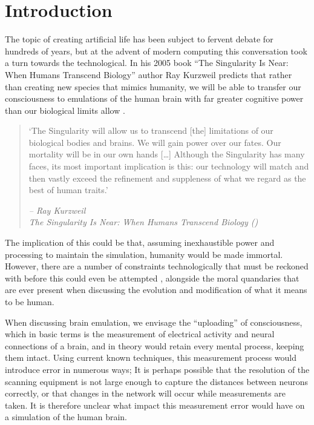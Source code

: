 \chapter{Introduction}


The topic of creating artificial life has been subject to fervent debate for
hundreds of years, but at the advent of modern computing this conversation took
a turn towards the technological. In his 2005 book “The Singularity Is Near:
When Humans Transcend Biology” author Ray Kurzweil predicts that rather than
creating new species that mimics humanity, we will be able to transfer our
consciousness to emulations of the human brain with far greater cognitive power
than our biological limits allow \autocite{kurzweil_singularity_2006}.

\begin{quote}
      `The Singularity will allow us to transcend [the] limitations of our
      biological bodies and brains. We will gain power over our fates. Our
      mortality will be in our own hands [\ldots] Although the Singularity has
      many faces, its most important implication is this: our technology will
      match and then vastly exceed the refinement and suppleness of what we
      regard as the best of human traits.'
\begin{flushright}
      \textit{-- Ray Kurzweil \\ The Singularity Is Near: When Humans Transcend
      Biology (\citeyear{kurzweil_singularity_2006})}
  \end{flushright}
\end{quote}  

The implication of this could be that, assuming inexhaustible power and
processing to maintain the simulation, humanity would be made immortal. However,
there are a number of constraints technologically that must be reckoned with
before this could even be attempted \parencite{bostrom_whole_2008}, alongside
the moral quandaries that are ever present when discussing the evolution and
modification of what it means to be human.

When discussing brain emulation, we envisage the “uploading” of consciousness,
which in basic terms is the measurement of electrical activity and neural
connections of a brain, and in theory would retain every mental process, keeping
them intact. Using current known techniques, this measurement process would
introduce error in numerous ways; It is perhaps possible that the resolution of
the scanning equipment is not large enough to capture the distances between
neurons correctly, or that changes in the network will occur while measurements
are taken. It is therefore unclear what impact this measurement error would have
on a simulation of the human brain.

